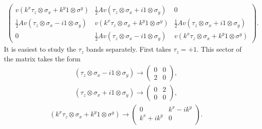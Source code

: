 \documentclass{article}
\newcommand{\ies}[1]{ \begin{equation*} \begin{split} #1 \end{split} \end{equation*}}
\begin{document}
\ies{
  \left( \begin{array}{ccc}
            v (k^x \tau_z \otimes \sigma_x + k^y 1 \otimes \sigma^y)
           &
           \frac{1}{2} A v (\tau_z \otimes \sigma_x + i 1 \otimes \sigma_y )
           &
           0
           \\
           \frac{1}{2} A v (\tau_z \otimes \sigma_x - i 1 \otimes \sigma_y )
           &
           v (k^x \tau_z \otimes \sigma_x + k^y 1 \otimes \sigma^y)
           &
           \frac{1}{2} A v (\tau_z \otimes \sigma_x + i 1 \otimes \sigma_y ) 
           \\
           0
           &
           \frac{1}{2} A v (\tau_z \otimes \sigma_x - i 1 \otimes \sigma_y )
           &
           v (k^x \tau_z \otimes \sigma_x + k^y 1 \otimes \sigma^y)
  \end{array} \right).
}
It is easiest to study the $\tau_z$ bands separately. First takes $\tau_z = +1$. This sector of the matrix takes the form
\ies{
   (\tau_z \otimes \sigma_x  -i 1 \otimes \sigma_y)
  \rightarrow
  \left(
  \begin{array}{cc}
    0&0\\
    2&0
  \end{array}
  \right),
}
\ies{
   (\tau_z \otimes \sigma_x + i 1 \otimes \sigma_y)
  \rightarrow
  \left(
  \begin{array}{cc}
    0&2\\
     0&0
  \end{array}
  \right),
}
\ies{
  (k^x \tau_z \otimes \sigma_x + k^y 1 \otimes \sigma^y)
  \rightarrow
  \left(
  \begin{array}{cc}
    0 & k^x - i k^y \\
    k^x + i k^y & 0 \\
  \end{array}
  \right).
}
\end{document}
